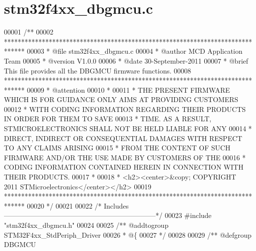\section{stm32f4xx\+\_\+dbgmcu.\+c}
\label{stm32f4xx__dbgmcu_8c_source}

\begin{DoxyCode}
00001 \textcolor{comment}{/**}
00002 \textcolor{comment}{  ******************************************************************************}
00003 \textcolor{comment}{  * @file    stm32f4xx\_dbgmcu.c}
00004 \textcolor{comment}{  * @author  MCD Application Team}
00005 \textcolor{comment}{  * @version V1.0.0}
00006 \textcolor{comment}{  * @date    30-September-2011}
00007 \textcolor{comment}{  * @brief   This file provides all the DBGMCU firmware functions.}
00008 \textcolor{comment}{  ******************************************************************************}
00009 \textcolor{comment}{  * @attention}
00010 \textcolor{comment}{  *}
00011 \textcolor{comment}{  * THE PRESENT FIRMWARE WHICH IS FOR GUIDANCE ONLY AIMS AT PROVIDING CUSTOMERS}
00012 \textcolor{comment}{  * WITH CODING INFORMATION REGARDING THEIR PRODUCTS IN ORDER FOR THEM TO SAVE}
00013 \textcolor{comment}{  * TIME. AS A RESULT, STMICROELECTRONICS SHALL NOT BE HELD LIABLE FOR ANY}
00014 \textcolor{comment}{  * DIRECT, INDIRECT OR CONSEQUENTIAL DAMAGES WITH RESPECT TO ANY CLAIMS ARISING}
00015 \textcolor{comment}{  * FROM THE CONTENT OF SUCH FIRMWARE AND/OR THE USE MADE BY CUSTOMERS OF THE}
00016 \textcolor{comment}{  * CODING INFORMATION CONTAINED HEREIN IN CONNECTION WITH THEIR PRODUCTS.}
00017 \textcolor{comment}{  *}
00018 \textcolor{comment}{  * <h2><center>&copy; COPYRIGHT 2011 STMicroelectronics</center></h2>}
00019 \textcolor{comment}{  ******************************************************************************}
00020 \textcolor{comment}{  */}
00021 
00022 \textcolor{comment}{/* Includes ------------------------------------------------------------------*/}
00023 \textcolor{preprocessor}{#}\textcolor{preprocessor}{include} "stm32f4xx_dbgmcu.h"
00024 
00025 \textcolor{comment}{/** @addtogroup STM32F4xx\_StdPeriph\_Driver}
00026 \textcolor{comment}{  * @\{}
00027 \textcolor{comment}{  */}
00028 
00029 \textcolor{comment}{/** @defgroup DBGMCU }

\end{DoxyCode}
